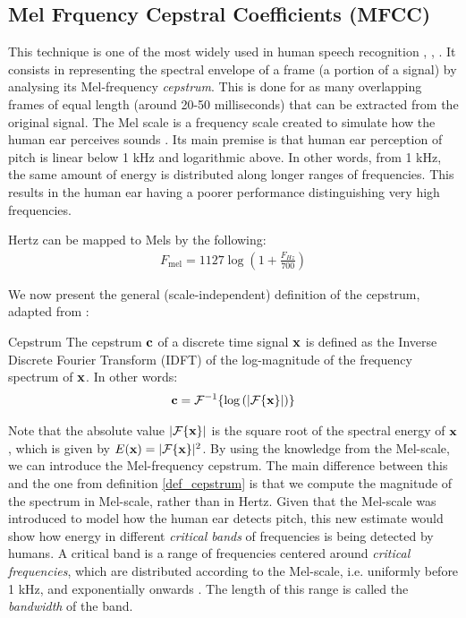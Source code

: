 \documentclass[../main.tex]{subfiles}
\begin{document}
\subsection{Mel Frquency Cepstral Coefficients (MFCC)}
\par This technique is one of the most widely used in human speech recognition \cite{Jurafsky2009}, \cite{Chou2008a}, \cite{Stowell2014}. It consists in representing the spectral envelope of a frame (a portion of a signal) by analysing its Mel-frequency \emph{cepstrum}. This is done for as many overlapping frames of equal length (around 20-50 milliseconds) that can be extracted from the original signal. The Mel scale is a frequency scale created to simulate how the human ear perceives sounds \cite{Sludge2000}. Its main premise is that human ear perception of pitch is linear below 1 kHz and logarithmic above. In other words, from 1 kHz, the same amount of energy is distributed along longer ranges of frequencies. This results in the human ear having a poorer performance distinguishing very high frequencies.
\par Hertz can be mapped to Mels by the following:
\begin{align*}
F_{\text{mel}} = 1127 \log{(1 + \frac{F_{Hz}}{700})}
\end{align*}
\theoremstyle{definition}
\par We now present the general (scale-independent) definition of the cepstrum, adapted from \cite{Gutierrez-Osuna2009}:
\begin{definition}{Cepstrum} \label{def_cepstrum}
The cepstrum $\mathbf{c}$ of a discrete time signal $\mathbf{x}$ is defined as the Inverse Discrete Fourier Transform (IDFT) of the log-magnitude of the frequency spectrum of $\mathbf{x}$. In other words:
\begin{align*}
\mathbf{c} = \mathcal{F}^{-1}\{\log{(\lvert\mathcal{F}\{\mathbf{x}\}\rvert)}\}
\end{align*}
\end{definition}
\par Note that the absolute value $\lvert\mathcal{F}\{\mathbf{x}\}\rvert$ is the square root of the spectral energy of $\mathbf{x}$, which is given by $E(\mathbf{x}) = \lvert\mathcal{F}\{\mathbf{x}\}\rvert^2$. By using the knowledge from the Mel-scale, we can introduce the Mel-frequency cepstrum. The main difference between this and the one from definition \ref{def_cepstrum} is that we compute the magnitude of the spectrum in Mel-scale, rather than in Hertz. Given that the Mel-scale was introduced to model how the human ear detects pitch, this new estimate would show how energy in different \emph{critical bands} of frequencies is being detected by humans. A critical band is a range of frequencies centered around \emph{critical frequencies}, which are distributed according to the Mel-scale, i.e. uniformly before 1 kHz, and exponentially onwards \cite{Gutierrez-Osuna2009}. The length of this range is called the \emph{bandwidth} of the band.
\end{document}
